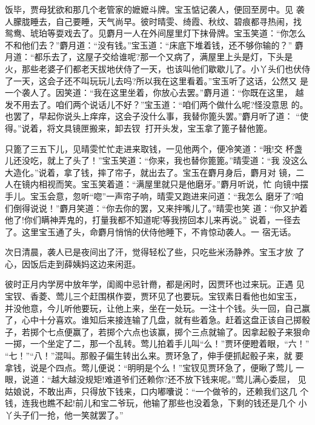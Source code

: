 饭毕，贾母犹欲和那几个老管家的嬷嬷斗牌。宝玉惦记袭人，便回至房中。见
袭人朦胧睡去，自己要睡，天气尚早。彼时晴雯、绮霞、秋纹、碧痕都寻热闹，找
鸳鸯、琥珀等耍戏去了。见麝月一人在外间屋里灯下抹骨牌。宝玉笑道：“你怎么
不和他们去？”麝月道：“没有钱。”宝玉道：“床底下堆着钱，还不够你输的？”
麝月道：“都乐去了，这屋子交给谁呢?那一个又病了，满屋里上头是灯，下头是
火，那些老婆子们都老天拔地伏侍了一天，也该叫他们歇歇儿了。小丫头们也伏侍
了一天，这会子还不叫玩玩儿去吗?所以我在这里看着。”宝玉听了这话，公然又
是一个袭人了。因笑道：“我在这里坐着，你放心去罢。”麝月道：“你既在这里，
越发不用去了。咱们两个说话儿不好？”宝玉道：“咱们两个做什么呢?怪没意思
的。也罢了，早起你说头上痒痒，这会子没什么事，我替你篦头罢。”麝月听了道：
“使得。”说着，将文具镜匣搬来，卸去钗，打开头发，宝玉拿了篦子替他篦。

只篦了三五下儿，见晴雯忙忙走进来取钱，一见他两个，便冷笑道：“哦!交
杯盏儿还没吃，就上了头了！”宝玉笑道：“你来，我也替你篦篦。”晴雯道：“我
没这么大造化。”说着，拿了钱，摔了帘子，就出去了。宝玉在麝月身后，麝月对
镜，二人在镜内相视而笑。宝玉笑着道：“满屋里就只是他磨牙。”麝月听说，忙
向镜中摆手儿。宝玉会意，忽听“唿”一声帘子响，晴雯又跑进来问道：“我怎么
磨牙了?咱们倒得说说！”麝月笑道：“你去你的罢，又来拌嘴儿了。”晴雯也笑
道：“你又护着他了!你们瞒神弄鬼的，打量我都不知道呢!等我捞回本儿来再说。”
说着，一径去了。这里宝玉通了头，命麝月悄悄的伏侍他睡下，不肯惊动袭人。一
宿无话。

次日清晨，袭人已是夜间出了汗，觉得轻松了些，只吃些米汤静养。宝玉才放
了心，因饭后走到薛姨妈这边来闲逛。

彼时正月内学房中放年学，闺阁中忌针黹，都是闲时，因贾环也过来玩。正遇
见宝钗、香菱、莺儿三个赶围棋作耍，贾环见了也要玩。宝钗素日看他也如宝玉，
并没他意，今儿听他要玩，让他上来，坐在一处玩。一注十个钱。头一回，自己赢
了，心中十分喜欢。谁知后来接连输了几盘，就有些着急。赶着这盘正该自己掷骰
子，若掷个七点便赢了，若掷个六点也该赢，掷个三点就输了。因拿起骰子来狠命
一掷，一个坐定了二，那一个乱转。莺儿拍着手儿叫“么！”贾环便瞪着眼，“六！”
“七！”“八！”混叫。那骰子偏生转出么来。贾环急了，伸手便抓起骰子来，就
要拿钱，说是个四点。莺儿便说：“明明是个么！”宝钗见贾环急了，便瞅了莺儿
一眼，说道：“越大越没规矩!难道爷们还赖你?还不放下钱来呢。”莺儿满心委屈，
见姑娘说，不敢出声，只得放下钱来，口内嘟囔说：“一个做爷的，还赖我们这几
个钱，连我也瞧不起!前儿和宝二爷玩，他输了那些也没着急，下剩的钱还是几个
小丫头子们一抢，他一笑就罢了。”

